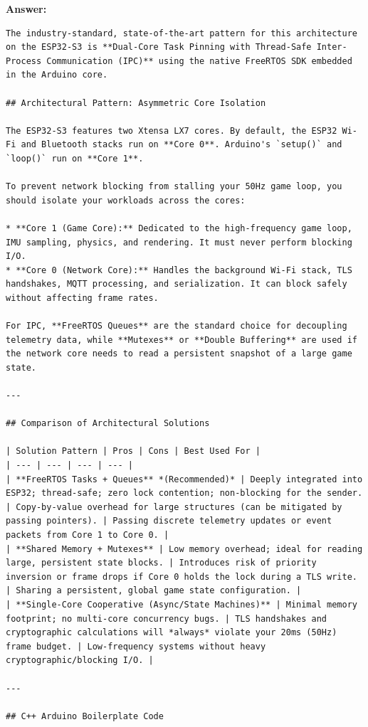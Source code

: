 \textbf{Answer:}
\begin{lstlisting}[language={}, breaklines=true]
The industry-standard, state-of-the-art pattern for this architecture on the ESP32-S3 is **Dual-Core Task Pinning with Thread-Safe Inter-Process Communication (IPC)** using the native FreeRTOS SDK embedded in the Arduino core.

## Architectural Pattern: Asymmetric Core Isolation

The ESP32-S3 features two Xtensa LX7 cores. By default, the ESP32 Wi-Fi and Bluetooth stacks run on **Core 0**. Arduino's `setup()` and `loop()` run on **Core 1**.

To prevent network blocking from stalling your 50Hz game loop, you should isolate your workloads across the cores:

* **Core 1 (Game Core):** Dedicated to the high-frequency game loop, IMU sampling, physics, and rendering. It must never perform blocking I/O.
* **Core 0 (Network Core):** Handles the background Wi-Fi stack, TLS handshakes, MQTT processing, and serialization. It can block safely without affecting frame rates.

For IPC, **FreeRTOS Queues** are the standard choice for decoupling telemetry data, while **Mutexes** or **Double Buffering** are used if the network core needs to read a persistent snapshot of a large game state.

---

## Comparison of Architectural Solutions

| Solution Pattern | Pros | Cons | Best Used For |
| --- | --- | --- | --- |
| **FreeRTOS Tasks + Queues** *(Recommended)* | Deeply integrated into ESP32; thread-safe; zero lock contention; non-blocking for the sender. | Copy-by-value overhead for large structures (can be mitigated by passing pointers). | Passing discrete telemetry updates or event packets from Core 1 to Core 0. |
| **Shared Memory + Mutexes** | Low memory overhead; ideal for reading large, persistent state blocks. | Introduces risk of priority inversion or frame drops if Core 0 holds the lock during a TLS write. | Sharing a persistent, global game state configuration. |
| **Single-Core Cooperative (Async/State Machines)** | Minimal memory footprint; no multi-core concurrency bugs. | TLS handshakes and cryptographic calculations will *always* violate your 20ms (50Hz) frame budget. | Low-frequency systems without heavy cryptographic/blocking I/O. |

---

## C++ Arduino Boilerplate Code


\end{lstlisting}
